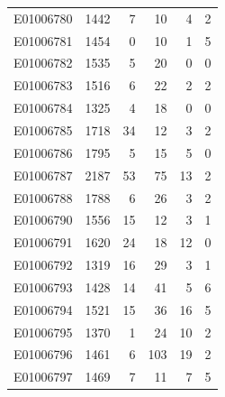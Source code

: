 \documentclass[
  letterpaper,
  DIV=11,
  numbers=noendperiod]{scrreprt}
\begin{document}
\begin{tabular}{lrrrrr}
E01006780     &    1442 &       7 &                    10 &                               4 &                       2 \\
E01006781     &    1454 &       0 &                    10 &                               1 &                       5 \\
E01006782     &    1535 &       5 &                    20 &                               0 &                       0 \\
E01006783     &    1516 &       6 &                    22 &                               2 &                       2 \\
E01006784     &    1325 &       4 &                    18 &                               0 &                       0 \\
E01006785     &    1718 &      34 &                    12 &                               3 &                       2 \\
E01006786     &    1795 &       5 &                    15 &                               5 &                       0 \\
E01006787     &    2187 &      53 &                    75 &                              13 &                       2 \\
E01006788     &    1788 &       6 &                    26 &                               3 &                       2 \\
E01006790     &    1556 &      15 &                    12 &                               3 &                       1 \\
E01006791     &    1620 &      24 &                    18 &                              12 &                       0 \\
E01006792     &    1319 &      16 &                    29 &                               3 &                       1 \\
E01006793     &    1428 &      14 &                    41 &                               5 &                       6 \\
E01006794     &    1521 &      15 &                    36 &                              16 &                       5 \\
E01006795     &    1370 &       1 &                    24 &                              10 &                       2 \\
E01006796     &    1461 &       6 &                   103 &                              19 &                       2 \\
E01006797     &    1469 &       7 &                    11 &                               7 &                       5 \\

\end{tabular}
\end{document}
